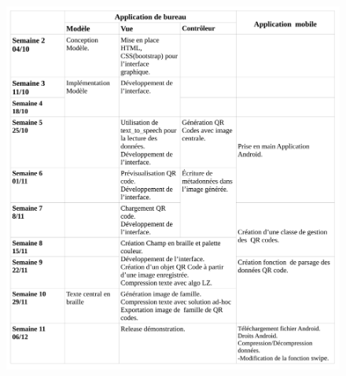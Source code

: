 \begin{figure}[!h]
	\centering
   \includegraphics[scale=0.28]{img/calendrier.png}
\end{figure}

\vspace{1cm}